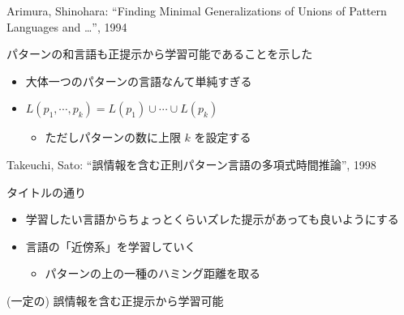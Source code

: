 \documentclass[professionalfont, 12pt, dvipdfmx, default, cjk]{beamer}
\begin{document}
\begin{frame}{Arimura, Shinohara: ``Finding Minimal Generalizations of
Unions of Pattern Languages and \ldots{}'', 1994}

パターンの和言語も正提示から学習可能であることを示した

\begin{itemize}
\itemsep1pt\parskip0pt
\item
  大体一つのパターンの言語なんて単純すぎる
\item
  \(L(p_1, \cdots, p_k) = L(p_1) \cup \cdots \cup L(p_k)\)

  \begin{itemize}
  \itemsep1pt\parskip0pt
  \item
    ただしパターンの数に上限 \(k\) を設定する
  \end{itemize}
\end{itemize}

\end{frame}

\begin{frame}{Takeuchi, Sato:
``誤情報を含む正則パターン言語の多項式時間推論'', 1998}

タイトルの通り

\begin{itemize}
\itemsep1pt\parskip0pt
\item
  学習したい言語からちょっとくらいズレた提示があっても良いようにする
\item
  言語の「近傍系」を学習していく

  \begin{itemize}
  \itemsep1pt\parskip0pt
  \item
    パターンの上の一種のハミング距離を取る
  \end{itemize}
\end{itemize}

(一定の) 誤情報を含む正提示から学習可能

\end{frame}
\end{document}
